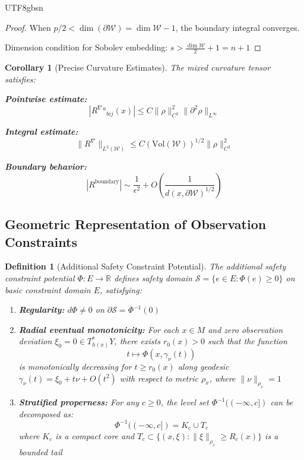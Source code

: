 \documentclass[a4paper,12pt]{extarticle}
\newtheorem{corollary}[theorem]{Corollary}
\newtheorem{definition}{Definition}
\theoremstyle{definition}
\begin{document}
\begin{CJK}{UTF8}{gbsn}
\begin{proof}
When $p/2 < \dim(\partial \mathcal{W}) = \dim \mathcal{W} - 1$, the boundary integral converges.

Dimension condition for Sobolev embedding: $s > \frac{\dim \mathcal{W}}{2} + 1 = n + 1$
\end{proof}

\begin{corollary}[Precise Curvature Estimates]
The mixed curvature tensor satisfies:

\textbf{Pointwise estimate:}
$$|R^{\nabla}{}^a{}_{bij}(x)| \leq C\|\rho\|_{C^2}^2 \|\partial^2 \rho\|_{L^\infty}$$

\textbf{Integral estimate:}
$$\|R^\nabla\|_{L^2(\mathcal{W})} \leq C(\text{Vol}(\mathcal{W}))^{1/2} \|\rho\|_{C^2}^2$$

\textbf{Boundary behavior:}
$$|R^{\text{boundary}}| \sim \frac{1}{\epsilon^2} + O\left(\frac{1}{d(x,\partial \mathcal{W})^{1/2}}\right)$$
\end{corollary}




\subsection{Geometric Representation of Observation Constraints}


\begin{definition}[Additional Safety Constraint Potential]
The additional safety constraint potential $\Phi: E \to \mathbb{R}$ defines safety domain $\mathcal{S} = \{e \in E : \Phi(e) \geq 0\}$ on basic constraint domain $E$, satisfying:
\begin{enumerate}[label=(\arabic*)]
\item \textbf{Regularity:} $d\Phi \neq 0$ on $\partial\mathcal{S} = \Phi^{-1}(0)$
\item \textbf{Radial eventual monotonicity:} For each $x \in M$ and zero observation deviation $\xi_0 = 0 \in T^*_{h(x)}Y$, there exists $r_0(x) > 0$ such that the function
   $$t \mapsto \Phi(x, \gamma_\nu(t))$$
   is monotonically decreasing for $t \geq r_0(x)$ along geodesic $\gamma_\nu(t) = \xi_0 + t\nu + O(t^2)$ with respect to metric $\rho_x$, where $\|\nu\|_{\rho_x} = 1$
\item \textbf{Stratified properness:} For any $c \geq 0$, the level set $\Phi^{-1}((-\infty, c])$ can be decomposed as:
   $$\Phi^{-1}((-\infty, c]) = K_c \cup T_c$$
   where $K_c$ is a compact core and $T_c \subset \{(x, \xi) : \|\xi\|_{\rho_x} \geq R_c(x)\}$ is a bounded tail
\end{enumerate}
\end{definition}



\end{CJK}
\end{document}
